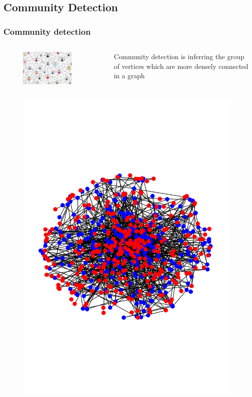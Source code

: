 \documentclass[notheorems]{beamer}
\begin{document}
\begin{frame}
\subsection{Community Detection}
\frametitle{Community detection}
\begin{columns}
	\begin{figure}
		\includegraphics[width=0.8\textwidth]{cd.png}
	\end{figure}
Community detection is inferring the group of vertices which are more
densely connected in a graph
\end{columns}
\begin{columns}
	\begin{figure}
		\includegraphics[width=\textwidth]{benno2t.pdf}

\end{figure}
\end{columns}
\end{frame}
\end{document}
